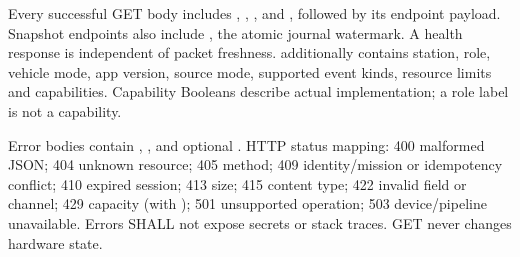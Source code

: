 Every successful GET body includes , ,
,  and , followed by its
endpoint payload. Snapshot endpoints also include , the
atomic journal watermark. A health response is independent of packet freshness.
 additionally contains station, role, vehicle mode, app version,
source mode, supported event kinds, resource limits and capabilities. Capability
Booleans describe actual implementation; a role label is not a capability.

Error bodies contain , ,
 and optional . HTTP status mapping:
400 malformed JSON; 404 unknown resource; 405 method; 409 identity/mission or
idempotency conflict; 410 expired session; 413 size; 415 content type; 422 invalid
field or channel; 429 capacity (with ); 501 unsupported operation;
503 device/pipeline unavailable. Errors SHALL not expose secrets or stack traces.
GET never changes hardware state.
